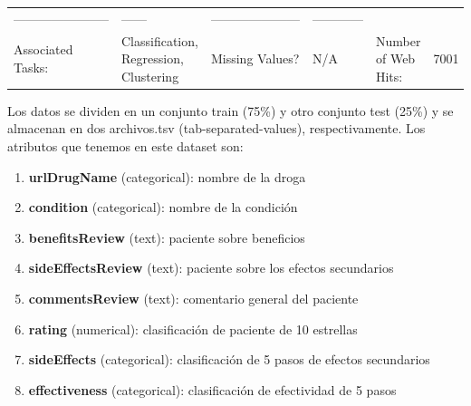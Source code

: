 \documentclass[spanish,]{article}
\providecommand{\tightlist}{%
  \setlength{\itemsep}{0pt}\setlength{\parskip}{0pt}}
\begin{document}
\begin{longtable}[]{@{}llllll@{}}
\begin{minipage}[t]{0.15\columnwidth}
-----------------------\strut
\end{minipage} & \begin{minipage}[t]{0.04\columnwidth}\raggedright\strut
------\strut
\end{minipage} & \begin{minipage}[t]{0.13\columnwidth}\raggedright\strut
---------------------\strut
\end{minipage} & \begin{minipage}[t]{0.08\columnwidth}\raggedright\strut
------------\strut
\end{minipage}\tabularnewline
\begin{minipage}[t]{0.18\columnwidth}\raggedright\strut
Associated Tasks:\strut
\end{minipage} & \begin{minipage}[t]{0.25\columnwidth}\raggedright\strut
Classification, Regression, Clustering\strut
\end{minipage} & \begin{minipage}[t]{0.15\columnwidth}\raggedright\strut
Missing Values?\strut
\end{minipage} & \begin{minipage}[t]{0.04\columnwidth}\raggedright\strut
N/A\strut
\end{minipage} & \begin{minipage}[t]{0.13\columnwidth}\raggedright\strut
Number of Web Hits:\strut
\end{minipage} & \begin{minipage}[t]{0.08\columnwidth}\raggedright\strut
7001\strut
\end{minipage}\tabularnewline
\bottomrule
\end{longtable}

Los datos se dividen en un conjunto train (75\%) y otro conjunto test
(25\%) y se almacenan en dos archivos.tsv (tab-separated-values),
respectivamente. Los atributos que tenemos en este dataset son:

\begin{enumerate}
\def\labelenumi{\arabic{enumi}.}
\tightlist
\item
  \textbf{urlDrugName} (categorical): nombre de la droga
\item
  \textbf{condition} (categorical): nombre de la condición
\item
  \textbf{benefitsReview} (text): paciente sobre beneficios
\item
  \textbf{sideEffectsReview} (text): paciente sobre los efectos
  secundarios
\item
  \textbf{commentsReview} (text): comentario general del paciente
\item
  \textbf{rating} (numerical): clasificación de paciente de 10 estrellas
\item
  \textbf{sideEffects} (categorical): clasificación de 5 pasos de
  efectos secundarios
\item
  \textbf{effectiveness} (categorical): clasificación de efectividad de
  5 pasos
\end{enumerate}
\end{document}
